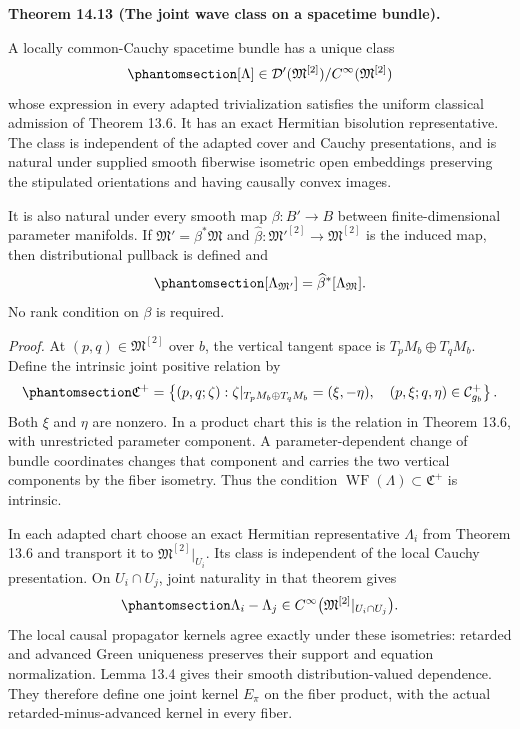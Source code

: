 \documentclass[
  english,
  11pt,
  reqno]{amsart}
\makeatletter
\newcommand{\pandocstatementheading}[1]{%
  \par\addpenalty{\@beginparpenalty}%
  \addvspace{.5\baselineskip plus .2\baselineskip minus .2\baselineskip}%
  {\normalfont\bfseries #1\par}%
  \nobreak\@afterindenttrue\@afterheading
}
\makeatother
\begin{document}
\pandocstatementheading{\protect{}\label{thm:intrinsic-family-canonical-wave}Theorem 14.13 (The joint wave class on a spacetime bundle).}

A locally common-Cauchy spacetime bundle has a unique class
\begin{equation}\protect\phantomsection\label{eq:intrinsic-joint-wave-class}{
[\Lambda]\in\mathcal D'(\mathfrak M^{[2]})/C^\infty(\mathfrak M^{[2]})
}\end{equation} whose expression in every adapted trivialization
satisfies the uniform classical admission of Theorem 13.6. It has an
exact Hermitian bisolution representative. The class is independent of
the adapted cover and Cauchy presentations, and is natural under
supplied smooth fiberwise isometric open embeddings preserving the
stipulated orientations and having causally convex images.

It is also natural under every smooth map \(\beta:B'\to B\) between
finite-dimensional parameter manifolds. If
\(\mathfrak M'=\beta^*\mathfrak M\) and
\(\widehat\beta:\mathfrak M'^{[2]}\to\mathfrak M^{[2]}\) is the induced
map, then distributional pullback is defined and
\begin{equation}\protect\phantomsection\label{eq:intrinsic-wave-base-change}{
[\Lambda_{\mathfrak M'}]=\widehat\beta^{*}[\Lambda_{\mathfrak M}].
}\end{equation} No rank condition on \(\beta\) is required.

\emph{Proof.} At \((p,q)\in\mathfrak M^{[2]}\) over \(b\), the vertical
tangent space is \(T_pM_b\oplus T_qM_b\). Define the intrinsic joint
positive relation by
\begin{equation}\protect\phantomsection\label{eq:intrinsic-family-positive-relation}{
\mathfrak C^+
=\left\{(p,q;\zeta):
\zeta|_{T_pM_b\oplus T_qM_b}=(\xi,-\eta),\quad
(p,\xi;q,\eta)\in\mathcal C_{g_b}^+\right\}.
}\end{equation} Both \(\xi\) and \(\eta\) are nonzero. In a product
chart this is the relation in Theorem 13.6, with unrestricted parameter
component. A parameter-dependent change of bundle coordinates changes
that component and carries the two vertical components by the fiber
isometry. Thus the condition
\(\operatorname{WF}(\Lambda)\subset\mathfrak C^+\) is intrinsic.

In each adapted chart choose an exact Hermitian representative
\(\Lambda_i\) from Theorem 13.6 and transport it to
\(\mathfrak M^{[2]}|_{U_i}\). Its class is independent of the local
Cauchy presentation. On \(U_i\cap U_j\), joint naturality in that
theorem gives
\begin{equation}\protect\phantomsection\label{eq:intrinsic-local-wave-comparison}{
\Lambda_i-\Lambda_j\in
C^\infty\bigl(\mathfrak M^{[2]}|_{U_i\cap U_j}\bigr).
}\end{equation} The local causal propagator kernels agree exactly under
these isometries: retarded and advanced Green uniqueness preserves their
support and equation normalization. Lemma 13.4 gives their smooth
distribution-valued dependence. They therefore define one joint kernel
\(E_\pi\) on the fiber product, with the actual retarded-minus-advanced
kernel in every fiber.
\end{document}
